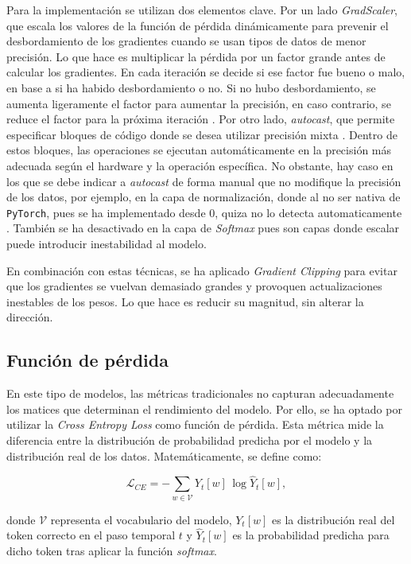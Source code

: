\documentclass[11pt]{book}
\theoremstyle{plain}
\theoremstyle{definition}
\begin{document}
Para la implementación se utilizan dos elementos clave. Por un lado \textit{GradScaler}, que escala los valores de la función de pérdida dinámicamente para prevenir el desbordamiento de los gradientes cuando se usan tipos de datos de menor precisión. Lo que hace es multiplicar la pérdida por un factor grande antes de calcular los gradientes. En cada iteración se decide si ese factor fue bueno o malo, en base a si ha habido desbordamiento o no. Si no hubo desbordamiento, se aumenta ligeramente el factor para aumentar la precisión, en caso contrario, se reduce el factor para la próxima iteración \parencite{amit2024mixedprecision}. Por otro lado, \textit{autocast}, que permite especificar bloques de código donde se desea utilizar precisión mixta \parencite{stack_overflow_gradscaler}. Dentro de estos bloques, las operaciones se ejecutan automáticamente en la precisión más adecuada según el hardware y la operación específica. No obstante, hay caso en los que se debe indicar a \textit{autocast} de forma manual que no modifique la precisión de los datos, por ejemplo, en la capa de normalización, donde al no ser nativa de \texttt{PyTorch}, pues se ha implementado desde 0, quiza no lo detecta automaticamente \parencite{amit2024mixedprecision}. También se ha desactivado en la capa de \textit{Softmax} pues son capas donde escalar puede introducir inestabilidad al modelo.

En combinación con estas técnicas, se ha aplicado \textit{Gradient Clipping} para evitar que los gradientes se vuelvan demasiado grandes y provoquen actualizaciones inestables de los pesos. Lo que hace es reducir su magnitud, sin alterar la dirección.

\subsection{Función de pérdida}

En este tipo de modelos, las métricas tradicionales no capturan adecuadamente los matices que determinan el rendimiento del modelo. Por ello, se ha optado por utilizar la \textit{Cross Entropy Loss} como función de pérdida. Esta métrica mide la diferencia entre la distribución de probabilidad predicha por el modelo y la distribución real de los datos. 
Matemáticamente, se define como:

\[
\mathcal{L}_{CE} = - \sum_{w \in \mathcal{V}} Y_t[w] \, \log \hat{Y}_t[w],
\]

donde $\mathcal{V}$ representa el vocabulario del modelo, $Y_t[w]$ es la distribución real del token correcto en el paso temporal $t$ y $\hat{Y}_t[w]$ es la probabilidad predicha para dicho token tras aplicar la función \textit{softmax}.
\end{document}
